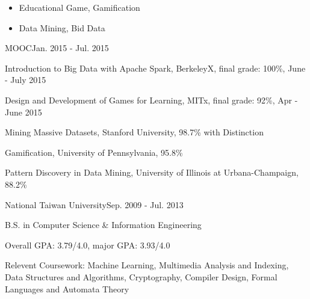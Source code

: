 \documentclass{joel_cv}
\begin{document}
\begin{cvHeader} 
\end{cvHeader}

%
%

\begin{itemize}
  \item Educational Game, Gamification
  \item Data Mining, Bid Data
\end{itemize}

%
%


\begin{sectionContentSimple}{MOOC}{Jan. 2015 - Jul. 2015}
  \item Introduction to Big Data with Apache Spark, BerkeleyX, final grade: 100\%, June - July 2015
  \item Design and Development of Games for Learning, MITx, final grade: 92\%, Apr - June 2015
  \item Mining Massive Datasets, Stanford University, 98.7\% with Distinction
  \item Gamification, University of Pennsylvania, 95.8\%
  \item Pattern Discovery in Data Mining, University of Illinois at Urbana-Champaign, 88.2\%
\end{sectionContentSimple}

\begin{sectionContentSimple}{National Taiwan University}{Sep. 2009 - Jul. 2013}
  \item B.S. in Computer Science \& Information Engineering
  \item Overall GPA: 3.79/4.0, major GPA: 3.93/4.0
  \item Relevent Coursework: Machine Learning, Multimedia Analysis and Indexing, Data Structures and Algorithms, Cryptography, Compiler Design, Formal Languages and Automata Theory
\end{sectionContentSimple}

%
%

\end{document}
